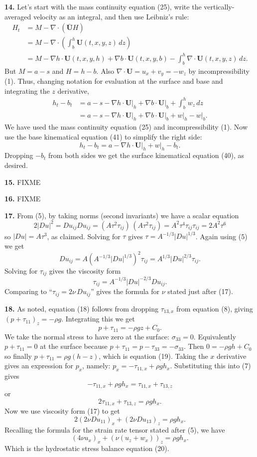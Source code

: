 \documentclass[10pt]{amsart}
\newcommand{\Div}{\nabla\cdot}
\newcommand{\grad}{\nabla}
\newcommand{\prob}[1]{\bigskip\noindent\large\textbf{#1.}\normalsize }
\begin{document}
\prob{14}  Let's start with the mass continuity equation (25), write the vertically-averaged velocity as an integral, and then use Leibniz's rule:
\begin{align*}
H_t &= M - \Div \left(\bar{\mathbf{U}} H \right) \\
    &= M - \Div \left(\int_b^h \mathbf{U}(t,x,y,z)\,dz\right) \\
    &= M - \grad h\cdot \mathbf{U}(t,x,y,h) + \grad b\cdot \mathbf{U}(t,x,y,b) - \int_b^h \Div \mathbf{U}(t,x,y,z)\,dz.
\end{align*}
But $M=a-s$ and $H=h-b$.  Also $\Div \mathbf{U} = u_x + v_y = - w_z$ by incompressibility (1).  Thus, changing notation for evaluation at the surface and base and integrating the $z$ derivative,
\begin{align*}
h_t - b_t &= a - s - \grad h\cdot \mathbf{U}\big|_h + \grad b\cdot \mathbf{U}\big|_b + \int_b^h w_z\,dz \\
    &= a - s - \grad h\cdot \mathbf{U}\big|_h + \grad b\cdot \mathbf{U}\big|_b + w\big|_h - w\big|_b.
\end{align*}
We have used the mass continuity equation (25) and incompressibility (1).  Now use the base kinematical equation (41) to simplify the right side:
  $$h_t - b_t = a - \grad h\cdot \mathbf{U}\big|_h + w\big|_h - b_t.$$
Dropping $-b_t$ from both sides we get the surface kinematical equation (40), as desired.

\prob{15}  FIXME

\prob{16}  FIXME

\prob{17}  From (5), by taking norms (second invariants) we have a scalar equation
    $$2 |Du|^2 = Du_{ij} Du_{ij} = (A \tau^2 \tau_{ij})\,(A \tau^2 \tau_{ij}) = A^2 \tau^4 \tau_{ij} \tau_{ij} = 2 A^2 \tau^6$$
so $|Du|=A\tau^3$, as claimed.  Solving for $\tau$ gives $\tau = A^{-1/3} |Du|^{1/3}$.  Again using (5) we get
    $$Du_{ij} = A \left(A^{-1/3} |Du|^{1/3}\right)^2 \tau_{ij} = A^{1/3} |Du|^{2/3} \tau_{ij}.$$
Solving for $\tau_{ij}$ gives the viscosity form
    $$\tau_{ij} = A^{-1/3} |Du|^{-2/3} Du_{ij}.$$
Comparing to ``$\tau_{ij} = 2 \nu\, Du_{ij}$'' gives the formula for $\nu$ stated just after (17).

\prob{18}  As noted, equation (18) follows from dropping $\tau_{13,x}$ from equation (8), giving $(p+\tau_{11})_z = -\rho g$.  Integrating this we get
    $$p+\tau_{11} = -\rho g z + C_0.$$
We take the normal stress to have zero at the surface: $\sigma_{33} = 0$.  Equivalently $p+\tau_{11}=0$ at the surface because $p+\tau_{11} = p-\tau_{33} = -\sigma_{33}$.  Then $0=-\rho g h + C_0$ so finally $p + \tau_{11} = \rho g (h-z)$, which is equation (19).  Taking the $x$ derivative gives an expression for $p_x$, namely: $p_x = -\tau_{11,x} + \rho g h_x$.  Substituting this into (7) gives
    $$-\tau_{11,x} + \rho g h_x = \tau_{11,x} + \tau_{13,z}$$
or
    $$2 \tau_{11,x} + \tau_{13,z} = \rho g h_x.$$
Now we use viscosity form (17) to get
    $$2 \left(2 \nu Du_{11}\right)_x + \left(2 \nu Du_{13}\right)_z = \rho g h_x.$$
Recalling the formula for the strain rate tensor stated after (5), we have
    $$\left(4 \nu u_x\right)_x + \left(\nu (u_z + w_x)\right)_z = \rho g h_x.$$
Which is the hydrostatic stress balance equation (20).
\end{document}
